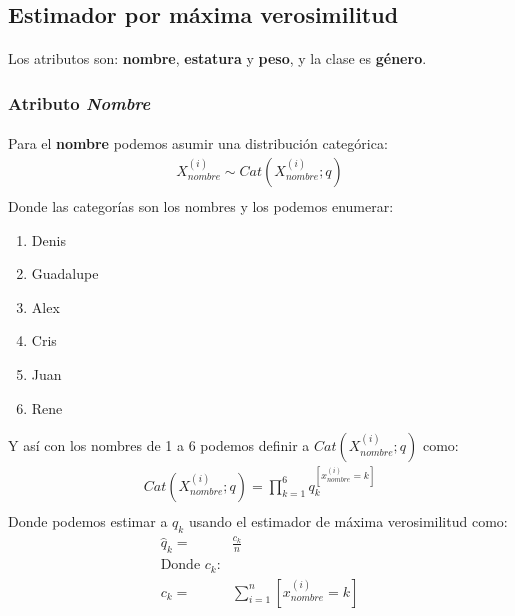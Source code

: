 \documentclass[12pt]{article}
\begin{document}
 \subsection{Estimador por máxima verosimilitud}
 \paragraph{} Los atributos son: \textbf{nombre}, \textbf{estatura} y \textbf{peso}, y la clase es \textbf{género}.\\
 \subsubsection{Atributo \textit{Nombre}}
 \paragraph{} Para el \textbf{nombre} podemos asumir una distribución categórica:
  \begin{equation}
  \begin{split}
  X_{nombre}^{(i)}\sim Cat(X_{nombre}^{(i)};q)\\
  \end{split}
  \end{equation}
  Donde las categorías son los nombres y los podemos enumerar:
  \begin{enumerate}
  	\item Denis
  	\item Guadalupe
  	\item Alex
  	\item Cris
  	\item Juan
  	\item Rene
  \end{enumerate}
  Y así con los nombres de 1 a 6 podemos definir a $Cat(X_{nombre}^{(i)};q)$ como:\\
  \begin{equation}
  \begin{split}
  Cat(X_{nombre}^{(i)};q) = \prod_{k=1}^{6}q_{k}^{[x_{nombre}^{(i)}=k ]}\\
  \end{split}
  \end{equation}
  Donde podemos estimar a $q_k$ usando el estimador de máxima verosimilitud como:
  \begin{equation}
  \begin{split}
  \hat{q}_k =& \frac{c_k}{n} \\ 
  \text{Donde $c_k$:}&\\
  c_k =& \sum_{i = 1}^{n}{[x^{(i)}_{nombre}=k]}
  \end{split}
  \end{equation}
\end{document}
